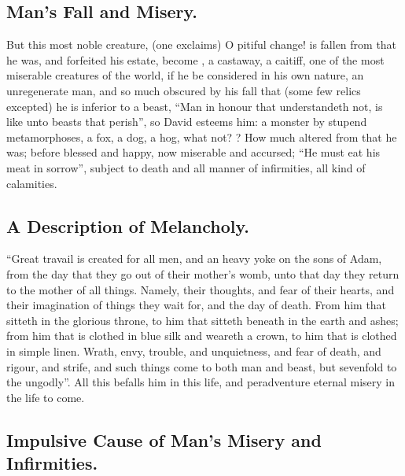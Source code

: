 \subsection{Man's Fall and Misery.}

But this most noble creature, 
(one exclaims) O pitiful change! is fallen from that he
was, and forfeited his estate, become , a castaway, a
caitiff, one of the most miserable creatures of the world, if he be considered
in his own nature, an unregenerate man, and so much obscured by his fall that
(some few relics excepted) he is inferior to a beast, \enquote{Man
in honour that understandeth not, is like unto beasts that perish}, so David
esteems him: a monster by stupend metamorphoses, a fox, a
dog, a hog, what not? ? How much altered from that
he was; before blessed and happy, now miserable and accursed;
\enquote{He must eat his meat in sorrow}, subject to death and all
manner of infirmities, all kind of calamities.

\subsection{A Description of Melancholy.}

\enquote{Great travail is created for all men, and an heavy yoke on the sons of Adam,
from the day that they go out of their mother's womb, unto that day they return
to the mother of all things. Namely, their thoughts, and fear of their hearts,
and their imagination of things they wait for, and the day of death. From him
that sitteth in the glorious throne, to him that sitteth beneath in the earth
and ashes; from him that is clothed in blue silk and weareth a crown, to him
that is clothed in simple linen. Wrath, envy, trouble, and unquietness, and
fear of death, and rigour, and strife, and such things come to both man and
beast, but sevenfold to the ungodly}. All this befalls him
in this life, and peradventure eternal misery in the life to come.

\subsection[The Impulsive Cause]{Impulsive Cause of Man's Misery and Infirmities.}


